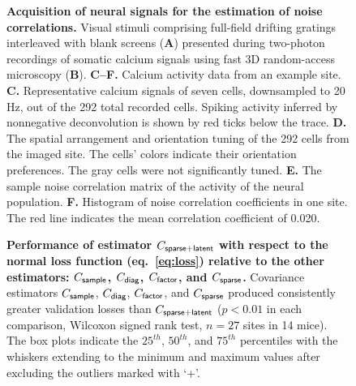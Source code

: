 \begin{figure}
\caption{{\bf Acquisition of neural signals for the estimation of noise correlations.}
Visual stimuli comprising full-field drifting gratings interleaved with blank screens ({\bf A}) presented during two-photon recordings of somatic calcium signals using fast 3D random-access microscopy ({\bf B}).
{\bf C--F.} Calcium activity data from an example site.
{\bf C.} Representative calcium signals of seven cells, downsampled to 20 Hz, out of the 292 total recorded cells. Spiking activity inferred by nonnegative deconvolution is shown by red ticks below the trace.
{\bf D.} The spatial arrangement and orientation tuning of the 292 cells from the imaged site. The cells' colors indicate their orientation preferences. The gray cells were not significantly tuned.
{\bf E.} The sample noise correlation matrix of the activity of the neural population.
{\bf F.} Histogram of noise correlation coefficients in one site. The red line indicates the mean correlation coefficient of 0.020.
} \label{fig:2}
\end{figure}

\begin{figure}
\caption{
{\bf Performance of estimator $C_{\sf sparse+latent}$ with respect to the normal loss function (eq.~\ref{eq:loss}) relative to the other estimators: $C_{\sf sample}$, $C_{\sf diag}$, $C_{\sf factor}$, and $C_{\sf sparse}$.}
Covariance estimators $C_{\sf sample}$, $C_{\sf diag}$, $C_{\sf factor}$, and $C_{\sf sparse}$ produced consistently greater validation losses than $C_{\sf sparse+latent}$ ($p<0.01$ in each comparison, Wilcoxon signed rank test, $n=27$ sites in 14 mice). The box plots indicate the $25^{th}$, $50^{th}$, and $75^{th}$ percentiles with the whiskers extending to the minimum and maximum values after excluding the outliers marked with `+'.
} \label{fig:3}
\end{figure}

